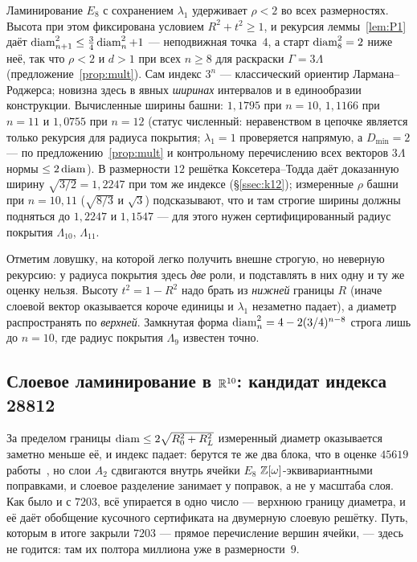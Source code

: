 Ламинирование $E_8$ с сохранением $\lambda_1$ удерживает $\rho<2$ во всех
размерностях. Высота при этом фиксирована условием $R^2+t^2\ge1$, и рекурсия
леммы~\ref{lem:P1} даёт $\operatorname{diam}^2_{n+1}\le\tfrac34\operatorname{diam}^2_n+1$ --- неподвижная
точка~$4$, а старт $\operatorname{diam}^2_8=2$ ниже неё, так что $\rho<2$ и $d>1$ при всех
$n\ge8$ для раскраски $\Gamma=3\Lambda$ (предложение~\ref{prop:mult}). Сам
индекс $3^n$ --- классический ориентир Лармана--Роджерса; новизна здесь в
явных \emph{ширинах} интервалов и в единообразии конструкции. Вычисленные
ширины башни: $1{,}1795$ при $n=10$, $1{,}1166$ при $n=11$ и $1{,}0755$ при
$n=12$ (статус численный: неравенством в цепочке является только рекурсия для
радиуса покрытия; $\lambda_1=1$ проверяется напрямую, а $D_{\min}=2$ --- по
предложению~\ref{prop:mult} и контрольному перечислению всех векторов
$3\Lambda$ нормы $\le2\operatorname{diam}$). В размерности $12$ решётка Коксетера--Тодда даёт
доказанную ширину $\sqrt{3/2}=1{,}2247$ при том же индексе (\S\ref{ssec:k12});
измеренные $\rho$ башни при $n=10,11$ ($\sqrt{8/3}$ и $\sqrt3$) подсказывают,
что и там строгие ширины должны подняться до $1{,}2247$ и $1{,}1547$ --- для
этого нужен сертифицированный радиус покрытия $\Lambda_{10}$, $\Lambda_{11}$.

Отметим ловушку, на которой легко получить внешне строгую, но неверную
рекурсию: у радиуса покрытия здесь \emph{две} роли, и подставлять в них одну и ту
же оценку нельзя. Высоту $t^2=1-R^2$ надо брать из \emph{нижней} границы $R$
(иначе слоевой вектор оказывается короче единицы и $\lambda_1$ незаметно падает),
а диаметр распространять по \emph{верхней}. Замкнутая форма
$\operatorname{diam}^2_n=4-2(3/4)^{n-8}$ строга лишь до $n=10$, где радиус покрытия
$\Lambda_9$ известен точно.

\subsection{Слоевое ламинирование в $\mathbb{R}^{10}$: кандидат индекса 28812}
\label{ssec:dim10lam}

За пределом границы $\operatorname{diam}\le2\sqrt{R_0^2+R_L^2}$ измеренный диаметр
оказывается заметно меньше её, и индекс падает: берутся те же два блока, что в
оценке $45619$ работы~\cite{Bounds}, но слои $A_2$ сдвигаются внутрь ячейки
$E_8$ $\mathbb{Z}[\omega]$-эквивариантными поправками, и слоевое разделение занимает у
поправок, а не у масштаба слоя. Как было и с $7203$, всё упирается в одно
число --- верхнюю границу диаметра, и её даёт обобщение кусочного сертификата
на двумерную слоевую решётку. Путь, которым в итоге закрыли $7203$ --- прямое
перечисление вершин ячейки, --- здесь не годится: там их полтора миллиона уже
в размерности~$9$.

